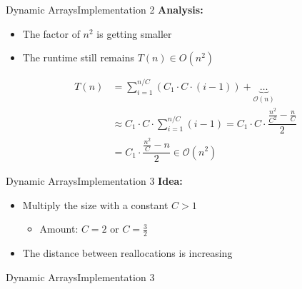 \begin{frame}{Dynamic Arrays}{Implementation 2}
  \textbf{Analysis:}
  \begin{itemize}
    \item
      The factor of $n^2$ is getting smaller
    \item
      The runtime still remains $T(n) \in O(n^2)$
  \end{itemize}
  \begin{align*}%
    T(n)
      &= \sum_{i=1}^{n/C} \left(C_1 \cdot C \cdot (i-1) \right)
        + \underbrace{\dots}_{\mathcal{O}(n)}\\
    {} &\approx C_1 \cdot C \cdot \sum_{i=1}^{n/C} (i-1)
    = C_1 \cdot C \cdot \dfrac{\frac{n^2}{C^2}-\frac{n}{C}}{2}\\
    {} &= C_1 \cdot \dfrac{\frac{n^2}{C}-n}{2}
    \in \mathcal{O}(n^2)
  \end{align*}
\end{frame}


\begin{frame}{Dynamic Arrays}{Implementation 3}
  \textbf{Idea:}
  \begin{itemize}
    \item
      Multiply the size with a constant $C > 1$
      \begin{itemize}
        \item
          Amount: $C = 2$ or $C = \frac{3}{2}$
      \end{itemize}
    \item
      The distance between reallocations is increasing
  \end{itemize}
\end{frame}


\begin{frame}{Dynamic Arrays}{Implementation 3}
  
\end{frame}



